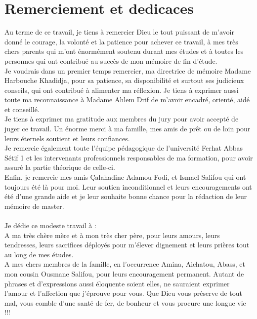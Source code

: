 \chapter*{Remerciement et dedicaces}
Au terme de ce travail, je tiens à remercier Dieu le tout puissant de m’avoir donné le courage, la volonté et la patience pour achever ce travail, à mes très chers parents qui m’ont énormément soutenu durant mes études et à toutes les personnes qui ont contribué au succès de mon mémoire de fin d’étude. \\
Je voudrais dans un premier temps remercier, ma directrice de mémoire Madame Harbouche Khadidja, pour sa patience, sa disponibilité et surtout ses judicieux conseils, qui ont contribué à alimenter ma réflexion. Je tiens à exprimer aussi toute ma reconnaissance à Madame Ahlem Drif de m’avoir encadré, orienté, aidé et conseillé. \\
Je tiens à exprimer ma gratitude aux membres du jury pour avoir accepté de juger ce travail. Un énorme merci à ma famille, mes amis de prêt ou de loin pour leurs éternels soutient et leurs confiances. \\
Je remercie également toute l’équipe pédagogique de l’université Ferhat Abbas Sétif 1 et les intervenants professionnels responsables de ma formation, pour avoir assuré la partie théorique de celle-ci. \\
Enfin, je remercie mes amis \c Calahadine Adamou Fodi, et Ismael Salifou qui ont toujours été là pour moi. Leur soutien inconditionnel et leurs encouragements ont été d’une grande aide et je leur souhaite bonne chance pour la rédaction de leur mémoire de master. \\ \\
Je dédie ce modeste travail à :\\
A ma très chère mère et à mon très cher père, pour leurs amours, leurs tendresses, leurs sacrifices déployés pour m’élever dignement et leurs prières tout au long de mes études. \\
A mes chers membres de la famille, en l’occurrence Amina, Aichatou, Abass, et mon cousin Ousmane Salifou, pour leurs encouragement permanent. Autant de phrases et d’expressions aussi éloquente soient elles, ne sauraient exprimer l’amour et l’affection que j’éprouve pour vous. Que Dieu vous préserve de tout mal, vous comble d’une santé de fer, de bonheur et vous procure une longue vie !!!